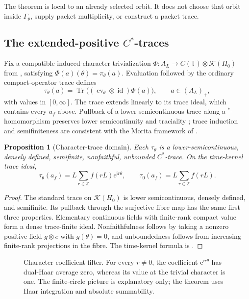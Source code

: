 \documentclass[11pt]{article}
\newtheorem{proposition}[theorem]{Proposition}
\theoremstyle{definition}
\newcommand{\Z}{\mathbb{Z}}
\newcommand{\T}{\mathbb{T}}
\newcommand{\K}{\mathcal{K}}
\newcommand{\e}{\mathrm{e}}
\newcommand{\ii}{\mathrm{i}}
\newcommand{\Tr}{\operatorname{Tr}}
\begin{document}
The theorem is local to an already selected orbit.  It does not choose that orbit inside \(\Gamma_p\), supply packet multiplicity, or construct a packet trace.

\subsection[The extended-positive C-star traces]{The extended-positive \(C^*\)-traces}

Fix a compatible induced-character trivialization \(\Phi:A_L\to C(\T)\otimes\K(H_0)\) from , satisfying \(\Phi(a)(\theta)=\pi_\theta(a)\).  Evaluation followed by the ordinary compact-operator trace defines
\begin{equation}
 \tau_\theta(a)=\Tr\bigl((\operatorname{ev}_\theta\otimes\operatorname{id})\Phi(a)\bigr),
 \qquad a\in(A_L)_+,\label{eq:taudef}
\end{equation}
with values in \([0,\infty]\).  The trace extends linearly to its trace ideal, which contains every \(a_f\) above.  Pullback of a lower-semicontinuous trace along a \(^{*}\)-homomorphism preserves lower semicontinuity and traciality \cite[Section~3.3 and Theorem~3.11, arXiv-v2 physical p.~12]{ElliottRobertSantiago2011}; trace induction and semifiniteness are consistent with the Morita framework of \cite[Proposition~2.2, pp.~72--73]{CombesZettl1983}.

\begin{proposition}[Character-trace domain]\label{prop:tau}
Each \(\tau_\theta\) is a lower-semicontinuous, densely defined, semifinite, nonfaithful, unbounded \(C^*\)-trace.  On the time-kernel trace ideal,
\[
 \tau_\theta(a_f)=L\sum_{r\in\Z}f(rL)\e^{\ii r\theta},
 \qquad
 \tau_0(a_f)=L\sum_{r\in\Z}f(rL).
\]
\end{proposition}

\begin{proof}
The standard trace on \(\K(H_0)\) is lower semicontinuous, densely defined, and semifinite.  Its pullback through the surjective fibre map has the same first three properties.  Elementary continuous fields with finite-rank compact value form a dense trace-finite ideal.  Nonfaithfulness follows by taking a nonzero positive field \(g\otimes e\) with \(g(\theta)=0\), and unboundedness follows from increasing finite-rank projections in the fibre.  The time-kernel formula is .
\end{proof}

\begin{figure}[htbp]
\centering

\caption{Character coefficient filter.  For every \(r\ne0\), the coefficient \(\e^{\ii r\theta}\) has dual-Haar average zero, whereas its value at the trivial character is one.  The finite-circle picture is explanatory only; the theorem uses Haar integration and absolute summability.}\label{fig:filter}
\end{figure}
\end{document}
